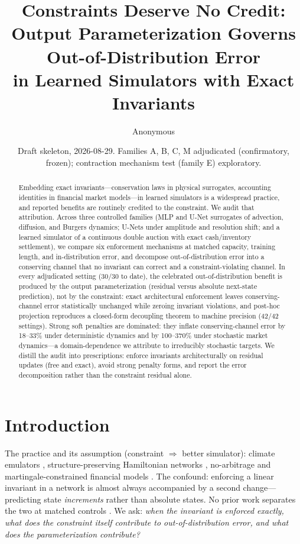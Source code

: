 \documentclass{article}
\title{Constraints Deserve No Credit:\\
Output Parameterization Governs Out-of-Distribution Error\\
in Learned Simulators with Exact Invariants}
\author{Anonymous}
\date{Draft skeleton, 2026-08-29. Families A, B, C, M adjudicated (confirmatory, frozen);
contraction mechanism test (family E) exploratory.}
\begin{document}
\maketitle

\begin{abstract}
Embedding exact invariants---conservation laws in physical surrogates, accounting identities
in financial market models---in learned simulators is a widespread practice, and reported
benefits are routinely credited to the constraint. We audit that attribution. Across three
controlled families (MLP and U-Net surrogates of advection, diffusion, and Burgers dynamics;
U-Nets under amplitude and resolution shift; and a learned simulator of a continuous double
auction with exact cash/inventory settlement), we compare six enforcement mechanisms at
matched capacity, training length, and in-distribution error, and decompose
out-of-distribution error into a conserving channel that no invariant can correct and a
constraint-violating channel. In every adjudicated setting (30/30 to date), the celebrated
out-of-distribution benefit is produced by the output parameterization (residual versus
absolute next-state prediction), not by the constraint: exact architectural enforcement leaves
conserving-channel error statistically unchanged while zeroing invariant violations, and
post-hoc projection reproduces a closed-form decoupling theorem to machine precision (42/42
settings). Strong soft penalties are dominated: they inflate conserving-channel error by
18--33\% under deterministic dynamics and by 100--370\% under stochastic market dynamics---a
domain-dependence we attribute to irreducibly stochastic targets. We distill the audit into
prescriptions: enforce invariants architecturally on residual updates (free and exact), avoid
strong penalty forms, and report the error decomposition rather than the constraint residual
alone.
\end{abstract}

\section{Introduction}
The practice and its assumption (constraint $\Rightarrow$ better simulator): climate emulators
\citep{beucler2019,beucler2021}, structure-preserving Hamiltonian networks
\citep{greydanus2019}, no-arbitrage and martingale-constrained financial models
\citep{cohen2023}. The confound: enforcing a linear invariant in a network is almost always
accompanied by a second change---predicting state \emph{increments} rather than absolute
states. No prior work separates the two at matched controls
\citep[see also][]{suh2022,pdebench}. We ask: \emph{when the invariant is enforced exactly,
what does the constraint itself contribute to out-of-distribution error, and what does the
parameterization contribute?}
\end{document}

